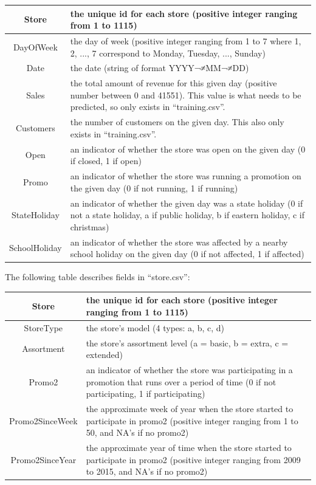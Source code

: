 \documentclass[letterpaper,twocolumn,11pt]{article}
\begin{document}
\begin{tabular}{| c | L{4cm} |}
  \hline
  Store & the unique id for each store (positive integer ranging from 1 to 1115) \\ \hline
  DayOfWeek & the day of week (positive integer ranging from 1 to 7 where 1, 2, ..., 7 correspond to Monday, Tuesday, ..., Sunday) \\ \hline
  Date & the date (string of format YYYY¬≠MM¬≠DD) \\ \hline
  Sales & the total amount of revenue for this given day (positive number between 0 and 41551). This value is what needs to be predicted, so only exists in ``training.csv''. \\ \hline
  Customers & the number of customers on the given day. This also only exists in ``training.csv''. \\ \hline
  Open & an indicator of whether the store was open on the given day (0 if closed, 1 if open) \\ \hline
  Promo & an indicator of whether the store was running a promotion on the given day (0 if not running, 1 if running) \\ \hline
  StateHoliday & an indicator of whether the given day was a state holiday (0 if not a state holiday, a if public holiday, b if eastern holiday, c if christmas) \\ \hline
  SchoolHoliday & an indicator of whether the store was affected by a nearby school holiday on the given day (0 if not affected, 1 if affected) \\ \hline
\end{tabular}


\hfill \break

The following table describes fields in ``store.csv'':

\begin{tabular}{| c | L{3.5cm} |}
  \hline
  Store & the unique id for each store (positive integer ranging from 1 to 1115) \\ \hline
  StoreType & the store's model (4 types: a, b, c, d) \\ \hline
  Assortment & the store's assortment level (a = basic, b = extra, c = extended) \\ \hline
  Promo2 & an indicator of whether the store was participating in a promotion that runs over a period of time  (0 if not participating, 1 if participating) \\ \hline
  Promo2SinceWeek & the approximate week of year when the store started to participate in promo2 (positive integer ranging from 1 to 50, and NA's if no promo2) \\ \hline
  Promo2SinceYear & the approximate year of time when the store started to participate in promo2 (positive integer ranging from 2009 to 2015, and NA's if no promo2) \\ \hline
\end{tabular}
\end{document}
